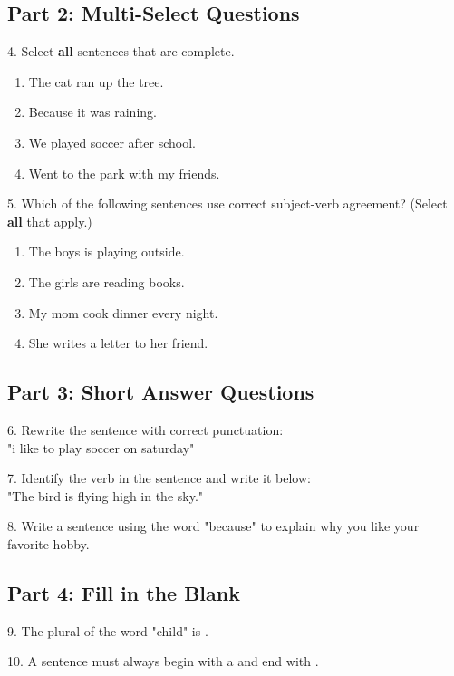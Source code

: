 \documentclass[12pt]{article}
\begin{document}
\vspace{1cm}
\newpage

\subsection*{Part 2: Multi-Select Questions}

4. Select \textbf{all} sentences that are complete.  
\begin{enumerate}[label=\Alph*.]
    \item The cat ran up the tree.  
    \item Because it was raining.  
    \item We played soccer after school.  
    \item Went to the park with my friends.  
\end{enumerate}

\vspace{1cm}

5. Which of the following sentences use correct subject-verb agreement? (Select \textbf{all} that apply.)  
\begin{enumerate}[label=\Alph*.]
    \item The boys is playing outside.  
    \item The girls are reading books.  
    \item My mom cook dinner every night.  
    \item She writes a letter to her friend.  
\end{enumerate}

\vspace{1cm}

\subsection*{Part 3: Short Answer Questions}

6. Rewrite the sentence with correct punctuation: \\ "i like to play soccer on saturday"

\vspace{3cm}

7. Identify the verb in the sentence and write it below: \\ "The bird is flying high in the sky."

\vspace{8cm}

8. Write a sentence using the word "because" to explain why you like your favorite hobby.

\vspace{3cm}

\subsection*{Part 4: Fill in the Blank}

9. The plural of the word "child" is \underline{\hspace{4cm}}.

\vspace{3cm}

10. A sentence must always begin with a \underline{\hspace{4cm}} and end with \underline{\hspace{4cm}}.

\vspace{3cm}
\end{document}
